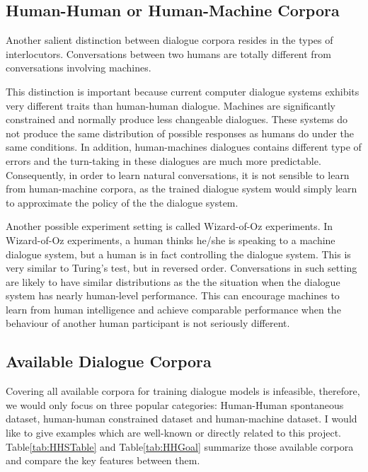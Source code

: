 \documentclass[bsc,frontabs,twoside,singlespacing,parskip,deptreport]{infthesis}     %
\begin{document}
\subsection{Human-Human or Human-Machine Corpora}

Another salient distinction between dialogue corpora resides in the types of interlocutors. Conversations between two humans are totally different from conversations involving machines.

This distinction is important because current computer dialogue systems exhibits very different traits than human-human dialogue\cite{doran2003comparing}. Machines are significantly constrained and normally produce less changeable dialogues. These systems do not produce the same distribution of possible responses as humans do under the same conditions. In addition, human-machines dialogues contains different type of errors and the turn-taking in these dialogues are much more predictable\cite{williams2007partially}. Consequently, in order to learn natural conversations, it is not sensible to learn from human-machine corpora, as the trained dialogue system would simply learn to approximate the policy of the the dialogue system\cite{serban2018survey}.

Another possible experiment setting is called Wizard-of-Oz experiments\cite{bohus2008sorry,petrik2004wizard,budzianowski2018multiwoz,eric2019multiwoz}. In Wizard-of-Oz experiments, a human thinks he/she is speaking to a machine dialogue system, but a human is in fact controlling the dialogue system. This is very similar to Turing's test, but in reversed order. Conversations in such setting are likely to have similar distributions as the the situation when the dialogue system has nearly human-level performance. This can encourage machines to learn from human intelligence and achieve comparable performance when the behaviour of another human participant is not seriously different.  

\subsection{Available Dialogue Corpora}

Covering all available corpora for training dialogue models is infeasible, therefore, we would only focus on three popular categories: Human-Human spontaneous dataset, human-human constrained dataset and human-machine dataset. I would like to give examples which are well-known or directly related to this project. Table\ref{tab:HHSTable} and Table\ref{tab:HHGoal} summarize those available corpora and compare the key features between them.
\end{document}
